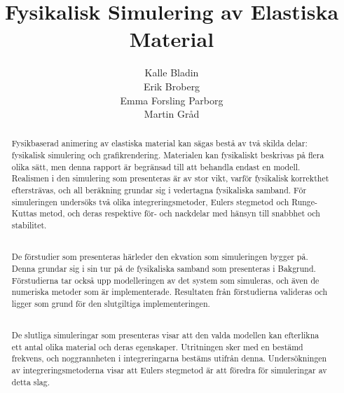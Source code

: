 \documentclass[a4paper,12pt,oneside,final,swedish]{extarticle}
\begin{document}
\author{Kalle Bladin\\Erik Broberg\\Emma Forsling Parborg\\Martin Gråd}
\title{Fysikalisk Simulering av Elastiska Material}
\clearpage\maketitle %
\thispagestyle{empty}

\pagebreak




\begin{abstract}
\thispagestyle{empty}
\noindent Fysikbaserad animering av elastiska material kan sägas bestå av två skilda delar: fysikalisk simulering och grafikrendering. Materialen kan fysikaliskt beskrivas på flera olika sätt, men denna rapport är begränsad till att behandla endast en modell. Realismen i den simulering som presenteras är av stor vikt, varför fysikalisk korrekthet eftersträvas, och all beräkning grundar sig i vedertagna fysikaliska samband. För simuleringen undersöks två olika integreringsmetoder, Eulers stegmetod och Runge-Kuttas metod, och deras respektive för- och nackdelar med hänsyn till snabbhet och stabilitet.

\noindent \\De förstudier som presenteras härleder den ekvation som simuleringen bygger på. Denna grundar sig i sin tur på de fysikaliska samband som presenteras i Bakgrund. Förstudierna tar också upp modelleringen av det system som simuleras, och även de numeriska metoder som är implementerade. Resultaten från förstudierna valideras och ligger som grund för den slutgiltiga implementeringen.

\noindent \\De slutliga simuleringar som presenteras visar att den valda modellen kan efterlikna ett antal olika material och deras egenskaper. Utritningen sker med en bestämd frekvens, och noggrannheten i integreringarna bestäms utifrån denna. Undersökningen av integreringsmetoderna visar att Eulers stegmetod är att föredra för simuleringar av detta slag.
\hfill
\end{abstract}
\pagebreak 

\tableofcontents  %
\pagebreak
\listoffigures    %
\pagebreak
\listoftables     %
\end{document}
